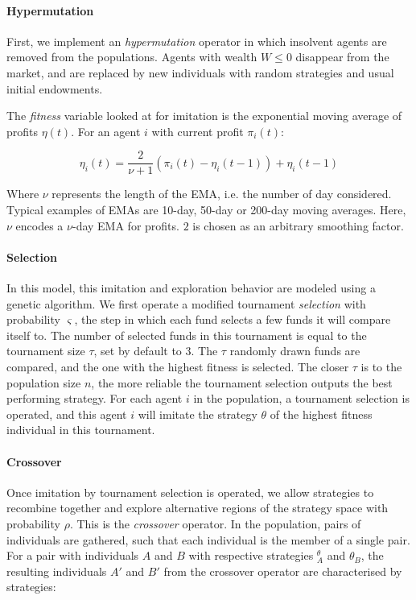 \documentclass{article}
\begin{document}
\paragraph{Hypermutation} First, we implement an \textit{hypermutation} operator in which insolvent agents are removed from the populations. Agents with wealth $W \leq 0$ disappear from the market, and are replaced by new individuals with random strategies and usual initial endowments.

The \textit{fitness} variable looked at for imitation is the exponential moving average of profits $\eta(t)$. For an agent $i$ with current profit $\pi_i(t)$:

\begin{equation}
    \eta_i(t) =  \frac{2}{ \nu + 1} \left(\pi_i(t) -  \eta_i(t-1)\right) +  \eta_i(t-1)
\end{equation}

Where $\nu$ represents the length of the EMA, i.e. the number of day considered. Typical examples of EMAs are 10-day, 50-day or 200-day moving averages. Here, $\nu$ encodes a $\nu$-day EMA for profits. $2$ is chosen as an arbitrary smoothing factor.\\

\paragraph{Selection} In this model, this imitation and exploration behavior are modeled using a genetic algorithm. We first operate a modified tournament \textit{selection} with probability $\varsigma$, the step in which each fund selects a few funds it will compare itself to. The number of selected funds in this tournament is equal to the tournament size $\tau$, set by default to 3. The $\tau$ randomly drawn funds are compared, and the one with the highest fitness is selected. The closer $\tau$ is to the population size $n$, the more reliable the tournament selection outputs the best performing strategy. For each agent $i$ in the population, a tournament selection is operated, and this agent $i$ will imitate the strategy $\theta$ of the highest fitness individual in this tournament.\\

\paragraph{Crossover} Once imitation by tournament selection is operated, we allow strategies to recombine together and explore alternative regions of the strategy space with probability $\rho$. This is the \textit{crossover} operator. In the population, pairs of individuals are gathered, such that each individual is the member of a single pair. For a pair with individuals $A$ and $B$ with respective strategies $^\theta_A$ and $\theta_B$, the resulting individuals $A'$ and $B'$ from the crossover operator are characterised by strategies:
\end{document}
